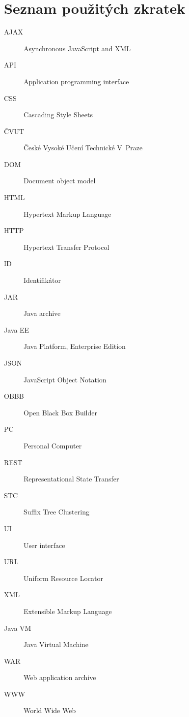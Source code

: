 \chapter{Seznam použitých zkratek}
\begin{description}
	\item[AJAX] Asynchronous JavaScript and XML
	\item[API] Application programming interface
	\item[CSS] Cascading Style Sheets
	\item[ČVUT] České Vysoké Učení Technické V~Praze
	\item[DOM] Document object model
	\item[HTML] Hypertext Markup Language
	\item[HTTP] Hypertext Transfer Protocol
	\item[ID] Identifikátor
	\item[JAR] Java archive
	\item[Java EE]	Java Platform, Enterprise Edition
	\item[JSON] JavaScript Object Notation
	\item[OBBB] Open Black Box Builder
	\item[PC] Personal Computer
	\item[REST] Representational State Transfer
	\item[STC] Suffix Tree Clustering
	\item[UI] User interface
	\item[URL] Uniform Resource Locator
	\item[XML] Extensible Markup Language
	\item[Java VM] Java Virtual Machine
	\item[WAR] Web application archive
	\item[WWW] World Wide Web
\end{description}